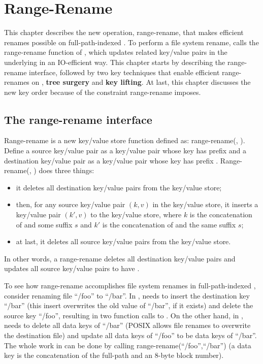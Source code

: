 \chapter{Range-Rename}
\label{chap:rename}

This chapter describes the new \bet operation, range-rename, that makes
efficient renames possible on full-path-indexed \betrfs.
To perform a file system rename, \betrfs calls the range-rename function of
\fti,
which updates related key/value pairs in the underlying \bet in an IO-efficient
way.
This chapter starts by describing the range-rename interface,
followed by two key techniques that enable efficient range-renames
on \bets, \textbf{tree surgery} and \textbf{key lifting}.
At last, this chapter discusses the new \betrfs key order because of the
constraint range-rename imposes.

\section{The range-rename interface}

Range-rename is a new key/value store function defined as:
range-rename(\spre, \dpre).
Define a source key/value pair as a key/value pair whose key has prefix \spre
and a destination key/value pair as a key/value pair whose key has prefix \dpre.
Range-rename(\spre, \dpre) does three things:
\begin{itemize}
\item it deletes all destination key/value pairs from the key/value store;
\item then, for any source key/value pair $(k,v)$ in the key/value store,
it inserts a key/value pair $(k',v)$ to the key/value store,
where $k$ is the concatenation of \spre and some suffix $s$ and $k'$ is the
concatenation of \dpre and the same suffix $s$;
\item at last, it deletes all source key/value pairs from the key/value store.
\end{itemize}
In other words, a range-rename deletes all destination key/value pairs and
updates all source key/value pairs to have \dpre.

To see how range-rename accomplishes file system renames in full-path-indexed
\betrfs, consider renaming file ``/foo'' to ``/bar''.
In \mdb, \betrfs needs to insert the destination key ``/bar''
(this insert overwrites the old value of ``/bar'', if it exists)
and delete the source key ``/foo'', resulting in two function calls to \fti.
On the other hand, in \ddb, \betrfs needs to delete all data keys of ``/bar''
(POSIX allows file renames to overwrite the destination file) and update all
data keys of ``/foo'' to be data keys of ``/bar''.
The whole work in \ddb can be done by calling range-rename(``/foo'',``/bar'')
(a data key is the concatenation of the full-path and an 8-byte block number).

